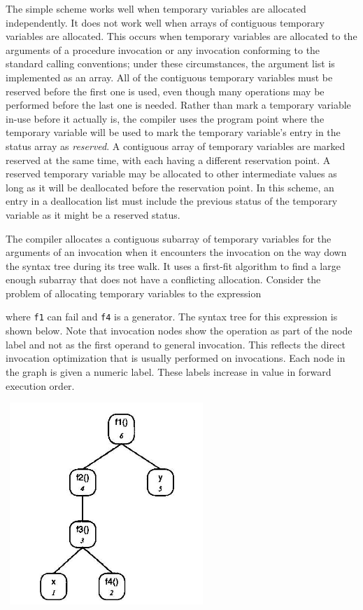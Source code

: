 The simple scheme works well when temporary variables are allocated
independently. It does not work well when arrays of contiguous
temporary variables are allocated. This occurs when temporary
variables are allocated to the arguments of a procedure invocation or
any invocation conforming to the standard calling conventions; under
these circumstances, the argument list is implemented as an array. All
of the contiguous temporary variables must be reserved before the
first one is used, even though many operations may be performed before
the last one is needed. Rather than mark a temporary variable in-use
before it actually is, the compiler uses the program point where the
temporary variable will be used to mark the temporary variable's entry
in the status array as \textit{reserved}. A contiguous array of
temporary variables are marked reserved at the same time, with each
having a different reservation point. A reserved temporary variable
may be allocated to other intermediate values as long as it will be
deallocated before the reservation point. In this scheme, an entry in
a deallocation list must include the previous status of the temporary
variable as it might be a reserved status.

The compiler allocates a contiguous subarray of temporary variables
for the arguments of an invocation when it encounters the invocation
on the way down the syntax tree during its tree walk. It uses a
first-fit algorithm to find a large enough subarray that does not have
a conflicting allocation. Consider the problem of allocating temporary
variables to the expression


\noindent where \texttt{f1} can fail and \texttt{f4} is a
generator. The syntax tree for this expression is shown below. Note
that invocation nodes show the operation as part of the node label and
not as the first operand to general invocation. This reflects the
direct invocation optimization that is usually performed on
invocations. Each node in the graph is given a numeric label. These
labels increase in value in forward execution order.

{\centering{}
\includegraphics[width=3.0in,height=3.0in]{kw/figure8-1.png}
\par}

